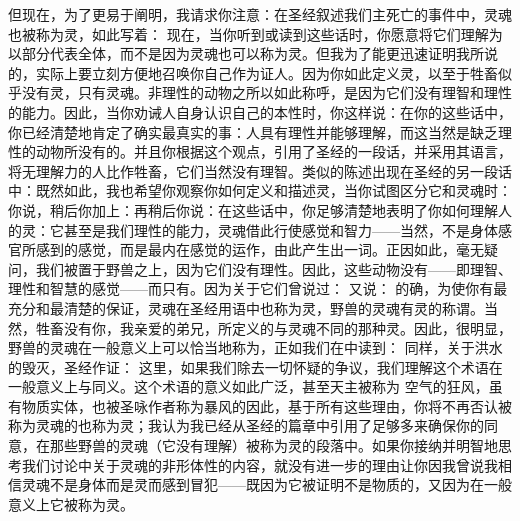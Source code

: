 但现在，为了更易于阐明，我请求你注意：在圣经叙述我们主死亡的事件中，灵魂也被称为灵，如此写着： 现在，当你听到或读到这些话时，你愿意将它们理解为以部分代表全体，而不是因为灵魂也可以称为灵。但我为了能更迅速证明我所说的，实际上要立刻方便地召唤你自己作为证人。因为你如此定义灵，以至于牲畜似乎没有灵，只有灵魂。非理性的动物之所以如此称呼，是因为它们没有理智和理性的能力。因此，当你劝诫人自身认识自己的本性时，你这样说：在你的这些话中，你已经清楚地肯定了确实最真实的事：人具有理性并能够理解，而这当然是缺乏理性的动物所没有的。并且你根据这个观点，引用了圣经的一段话，并采用其语言，将无理解力的人比作牲畜，它们当然没有理智。类似的陈述出现在圣经的另一段话中：既然如此，我也希望你观察你如何定义和描述灵，当你试图区分它和灵魂时：你说，稍后你加上：再稍后你说：在这些话中，你足够清楚地表明了你如何理解人的灵：它甚至是我们理性的能力，灵魂借此行使感觉和智力——当然，不是身体感官所感到的感觉，而是最内在感觉的运作，由此产生出一词。正因如此，毫无疑问，我们被置于野兽之上，因为它们没有理性。因此，这些动物没有——即理智、理性和智慧的感觉——而只有。因为关于它们曾说过： 又说： 的确，为使你有最充分和最清楚的保证，灵魂在圣经用语中也称为灵，野兽的灵魂有灵的称谓。当然，牲畜没有你，我亲爱的弟兄，所定义的与灵魂不同的那种灵。因此，很明显，野兽的灵魂在一般意义上可以恰当地称为，正如我们在中读到： 同样，关于洪水的毁灭，圣经作证： 这里，如果我们除去一切怀疑的争议，我们理解这个术语在一般意义上与同义。这个术语的意义如此广泛，甚至天主被称为 空气的狂风，虽有物质实体，也被圣咏作者称为暴风的因此，基于所有这些理由，你将不再否认被称为灵魂的也称为灵；我认为我已经从圣经的篇章中引用了足够多来确保你的同意，在那些野兽的灵魂（它没有理解）被称为灵的段落中。如果你接纳并明智地思考我们讨论中关于灵魂的非形体性的内容，就没有进一步的理由让你因我曾说我相信灵魂不是身体而是灵而感到冒犯——既因为它被证明不是物质的，又因为在一般意义上它被称为灵。\par

